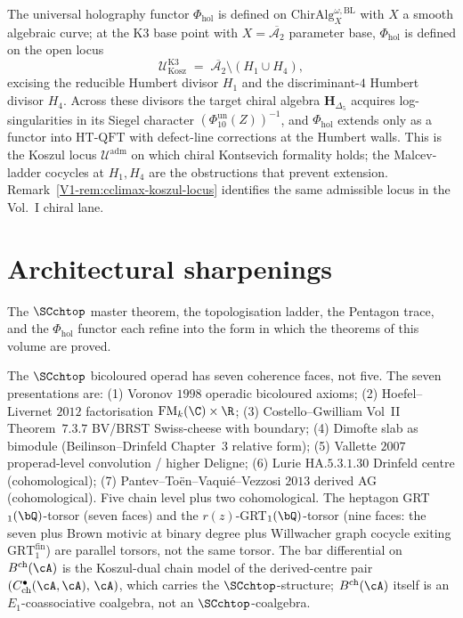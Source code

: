 \begin{remark}
\label{rem:v2-preface-koszul-locus}
The universal holography functor $\Phi_{\mathrm{hol}}$ is defined
on $\mathrm{ChirAlg}^{\omega, \mathrm{BL}}_X$ with $X$ a smooth
algebraic curve; at the K3 base point with
$X = \overline{\mathcal A_2}$ parameter base, $\Phi_{\mathrm{hol}}$
is defined on the open locus
\[
 \mathcal U_{\mathrm{Kosz}}^{\mathrm{K3}}
 \;=\; \overline{\mathcal A_2} \setminus (H_1 \cup H_4),
\]
excising the reducible Humbert divisor $H_1$ and the
discriminant-$4$ Humbert divisor $H_4$. Across these divisors
the target chiral algebra $\mathbf H_{\Delta_5}$ acquires
log-singularities in its Siegel character
$(\Phi_{10}^{\mathrm{un}}(Z))^{-1}$, and
$\Phi_{\mathrm{hol}}$ extends only as a functor into
$\mathrm{HT\text{-}QFT}$ with defect-line corrections at the
Humbert walls. This is the Koszul locus
$\mathcal U^{\mathrm{adm}}$ on which chiral Kontsevich formality
holds; the Malcev-ladder cocycles at $H_1, H_4$ are the
obstructions that prevent extension. Remark~\ref{V1-rem:cclimax-koszul-locus}
identifies the same admissible locus in the Vol.~I chiral lane.
\end{remark}

\section{Architectural sharpenings}
\label{sec:v2-preface-architectural-sharpenings}

The $\SCchtop$ master theorem, the topologisation ladder, the
Pentagon trace, and the $\Phi_{\mathrm{hol}}$ functor each refine
into the form in which the theorems of this volume are
proved.

\begin{remark}
\label{rem:v2-preface-heptagon}
The $\SCchtop$ bicoloured operad has seven coherence faces, not
five. The seven presentations are: (1) Voronov $1998$ operadic
bicoloured axioms; (2) Hoefel--Livernet $2012$ factorisation
$\mathrm{FM}_k(\C)\times\R$; (3) Costello--Gwilliam Vol~II
Theorem~$7.3.7$ BV/BRST Swiss-cheese with boundary; (4) Dimofte
slab as bimodule (Beilinson--Drinfeld Chapter~3 relative form);
(5) Vallette $2007$ properad-level convolution / higher Deligne;
(6) Lurie $\mathrm{HA}.5.3.1.30$ Drinfeld centre (cohomological);
(7) Pantev--To\"en--Vaqui\'e--Vezzosi $2013$ derived AG
(cohomological). Five chain level plus two cohomological. The
heptagon GRT$_1(\bQ)$-torsor (seven faces) and the
$r(z)$-GRT$_1(\bQ)$-torsor (nine faces: the seven plus Brown
motivic at binary degree plus Willwacher graph cocycle exiting
$\mathrm{GRT}_1^{\mathrm{fin}}$) are parallel torsors, not the
same torsor. The bar differential on
$B^{\mathrm{ch}}(\cA)$ is the Koszul-dual chain model of the
derived-centre pair
$(C^{\bullet}_{\mathrm{ch}}(\cA,\cA),\,\cA)$, which carries the
$\SCchtop$-structure; $B^{\mathrm{ch}}(\cA)$ itself is an
$E_1$-coassociative coalgebra, not an $\SCchtop$-coalgebra.
\end{remark}

